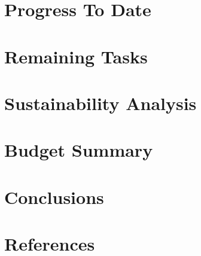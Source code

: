 \documentclass[a4paper,12pt]{article}
\begin{document}
\section{Progress To Date}

\section{Remaining Tasks}

\section{Sustainability Analysis}

\section{Budget Summary}

\section{Conclusions}

\section{References}
\end{document}
